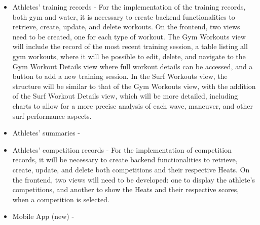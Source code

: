 \documentclass[a4paper,twoside,11pt]{article}
\begin{document}
\begin{itemize}
\item Athletes' training records - For the implementation of the training records, both gym and water, it is necessary to create backend functionalities to retrieve, create, update, and delete workouts. On the frontend, two views need to be created, one for each type of workout. The Gym Workouts view will include the record of the most recent training session, a table listing all gym workouts, where it will be possible to edit, delete, and navigate to the Gym Workout Details view where full workout details can be accessed, and a button to add a new training session. In the Surf Workouts view, the structure will be similar to that of the Gym Workouts view, with the addition of the Surf Workout Details view, which will be more detailed, including charts to allow for a more precise analysis of each wave, maneuver, and other surf performance aspects.

\item Athletes' summaries - 

\item Athletes' competition records - For the implementation of competition records, it will be necessary to create backend functionalities to retrieve, create, update, and delete both competitions and their respective Heats. On the frontend, two views will need to be developed: one to display the athlete’s competitions, and another to show the Heats and their respective scores, when a competition is selected.

\item Mobile App (new) - 
\end{itemize}

% 
% 
\end{document}
